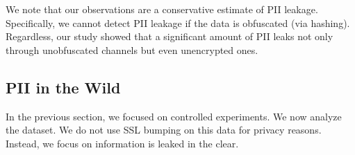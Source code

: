 We note that our observations are a conservative estimate of PII leakage. Specifically, 
we cannot detect PII leakage if the data is obfuscated (\eg via hashing). Regardless, 
our study showed that a significant amount of PII leaks not only through unobfuscated 
channels but even unencrypted ones. 



\subsection{PII in the Wild}

In the previous section, we focused on controlled experiments. We now
analyze the \mobWild{} dataset. We do not use SSL bumping on this data 
for privacy reasons. Instead, we focus on information is leaked in the clear.

